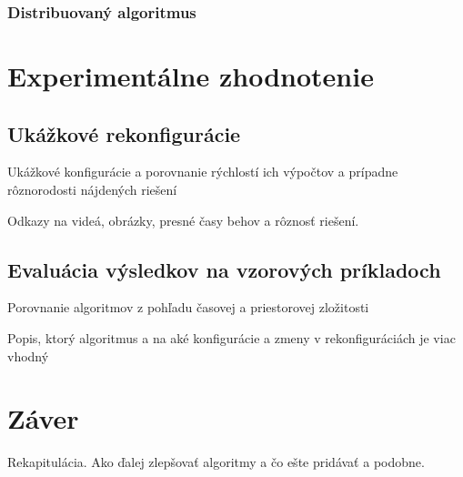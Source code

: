 \documentclass[
  digital, %
  twoside, %
  table,   %
  nolof,     %
  nolot,     %
]{fithesis3}
\begin{document}
\subsection{Distribuovaný algoritmus}

\chapter{Experimentálne zhodnotenie}
\section{Ukážkové rekonfigurácie}
Ukážkové konfigurácie a porovnanie rýchlostí ich výpočtov a prípadne rôznorodosti nájdených riešení

Odkazy na videá, obrázky, presné časy behov a rôznosť riešení. 
\section{Evaluácia výsledkov na vzorových príkladoch}
Porovnanie algoritmov z pohľadu časovej a priestorovej zložitosti

Popis, ktorý algoritmus a na aké konfigurácie a zmeny v rekonfiguráciách je viac vhodný

\chapter{Záver}
Rekapitulácia. 
Ako ďalej zlepšovať algoritmy a čo ešte pridávať a podobne. 

  \printbibliography[heading=bibintoc] %
\end{document}
